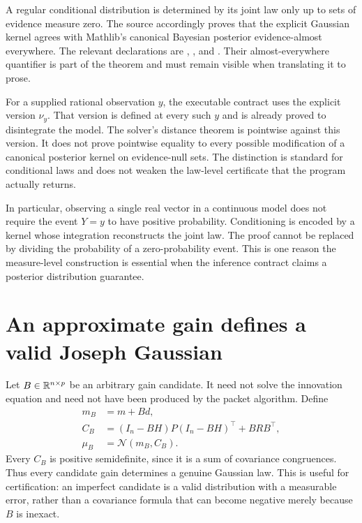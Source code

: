 A regular conditional distribution is determined by its joint law only up to sets of evidence measure zero. The source accordingly proves that the explicit Gaussian kernel agrees with Mathlib's canonical Bayesian posterior evidence-almost everywhere. The relevant declarations are , , and . Their almost-everywhere quantifier is part of the theorem and must remain visible when translating it to prose.

For a supplied rational observation $y$, the executable contract uses the explicit version $\nu_y$. That version is defined at every such $y$ and is already proved to disintegrate the model. The solver's distance theorem is pointwise against this version. It does not prove pointwise equality to every possible modification of a canonical posterior kernel on evidence-null sets. The distinction is standard for conditional laws and does not weaken the law-level certificate that the program actually returns.

In particular, observing a single real vector in a continuous model does not require the event $Y=y$ to have positive probability. Conditioning is encoded by a kernel whose integration reconstructs the joint law. The proof cannot be replaced by dividing the probability of a zero-probability event. This is one reason the measure-level construction is essential when the inference contract claims a posterior distribution guarantee.

\section{An approximate gain defines a valid Joseph Gaussian}
\label{sec:foundation-joseph}

Let $B\in\mathbb R^{n\times p}$ be an arbitrary gain candidate. It need not solve the innovation equation and need not have been produced by the packet algorithm. Define
\begin{align}
 m_B&=m+Bd,\label{eq:foundation-approx-mean}\\
 C_B&=(I_n-BH)P(I_n-BH)^\top+BRB^\top,\label{eq:foundation-approx-cov}\\
 \mu_B&=\mathcal N(m_B,C_B).\label{eq:foundation-approx-law}
\end{align}
Every $C_B$ is positive semidefinite, since it is a sum of covariance congruences. Thus every candidate gain determines a genuine Gaussian law. This is useful for certification: an imperfect candidate is a valid distribution with a measurable error, rather than a covariance formula that can become negative merely because $B$ is inexact.

